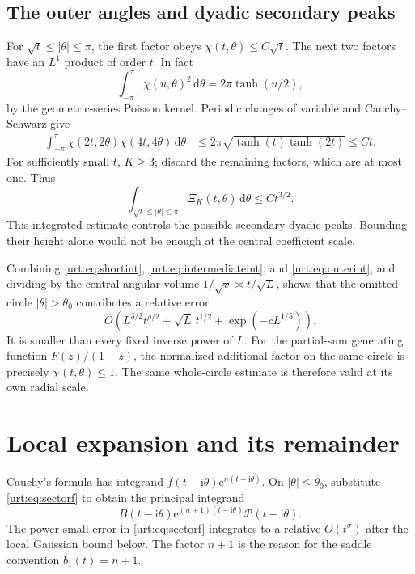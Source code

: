 \documentclass[11pt,letterpaper]{article}
\theoremstyle{remark}\newtheorem{remark}[theorem]{Remark}
\newcommand{\Pc}{\mathcal P}\newcommand{\Bc}{\mathcal B}\newcommand{\dd}{\mathrm d}
\newcommand{\ii}{\mathrm i}\newcommand{\ee}{\mathrm e}\newcommand{\ZZ}{\mathbb Z}\newcommand{\NN}{\mathbb N}
\begin{document}
\subsection{The outer angles and dyadic secondary peaks}
For $\sqrt t\le|\theta|\le\pi$, the first factor obeys $\chi(t,\theta)\le C\sqrt t$. The next two factors have an $L^1$ product of order $t$. In fact
\begin{equation}\label{urt:eq:chiL2}
 \int_{-\pi}^{\pi}\chi(u,\theta)^2\,\dd\theta=2\pi\tanh(u/2),
\end{equation}
by the geometric-series Poisson kernel. Periodic changes of variable and Cauchy--Schwarz give
\begin{align*}
 \int_{-\pi}^{\pi}\chi(2t,2\theta)\chi(4t,4\theta)\,\dd\theta
 &\le2\pi\sqrt{\tanh(t)\tanh(2t)}\le Ct.
\end{align*}
For sufficiently small $t$, $K\ge3$; discard the remaining factors, which are at most one. Thus
\begin{equation}\label{urt:eq:outerint}
 \int_{\sqrt t\le|\theta|\le\pi}\Xi_K(t,\theta)\,\dd\theta\le Ct^{3/2}.
\end{equation}
This integrated estimate controls the possible secondary dyadic peaks. Bounding their height alone would not be enough at the central coefficient scale.

Combining \eqref{urt:eq:shortint}, \eqref{urt:eq:intermediateint}, and \eqref{urt:eq:outerint}, and dividing by the central angular volume $1/\sqrt v\asymp t/\sqrt L$, shows that the omitted circle $|\theta|>\theta_0$ contributes a relative error
\begin{equation}\label{urt:eq:fullminor}
 O\!\left(L^{3/2}t^{\rho/2}+\sqrt L\,t^{1/2}
           +\exp(-cL^{1/5})\right).
\end{equation}
It is smaller than every fixed inverse power of $L$. For the partial-sum generating function $F(z)/(1-z)$, the normalized additional factor on the same circle is precisely $\chi(t,\theta)\le1$. The same whole-circle estimate is therefore valid at its own radial scale.

\section{Local expansion and its remainder}\label{urt:sec:local}
Cauchy's formula has integrand $f(t-\ii\theta)\ee^{n(t-\ii\theta)}$. On $|\theta|\le\theta_0$, substitute \eqref{urt:eq:sectorf} to obtain the principal integrand
\[
 B(t-\ii\theta)\ee^{(n+1)(t-\ii\theta)}\Pc(t-\ii\theta).
\]
The power-small error in \eqref{urt:eq:sectorf} integrates to a relative $O(t^\sigma)$ after the local Gaussian bound below. The factor $n+1$ is the reason for the saddle convention $b_1(t)=n+1$.
\end{document}
